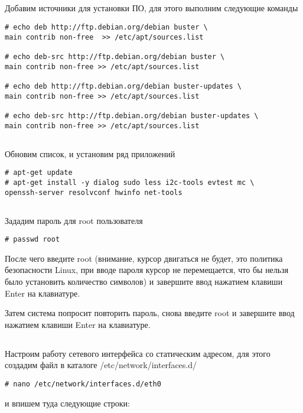 \subsection{}Добавим источники для установки ПО, для этого выполним следующие команды 
\begin{lstlisting}[style=bash]
# echo deb http://ftp.debian.org/debian buster \
main contrib non-free  >> /etc/apt/sources.list

# echo deb-src http://ftp.debian.org/debian buster \
main contrib non-free >> /etc/apt/sources.list

# echo deb http://ftp.debian.org/debian buster-updates \
main contrib non-free >> /etc/apt/sources.list

# echo deb-src http://ftp.debian.org/debian buster-updates \
main contrib non-free >> /etc/apt/sources.list
\end{lstlisting}

\subsection{} Обновим список, и установим ряд приложений
\begin{lstlisting}[style=bash]
# apt-get update
# apt-get install -y dialog sudo less i2c-tools evtest mc \
openssh-server resolvconf hwinfo net-tools
\end{lstlisting}

\subsection{}Зададим пароль для root пользователя
\begin{lstlisting}[style=bash]
# passwd root
\end{lstlisting}
После чего введите root (внимание, курсор двигаться не будет, это политика безопасности Linux, при вводе пароля курсор не перемещается, что бы нельзя было установить количество символов) и завершите ввод нажатием клавиши Enter на клавиатуре.

Затем система попросит повторить пароль, снова введите root и завершите ввод нажатием клавиши Enter на клавиатуре.

\subsection{}Настроим работу сетевого интерфейса со статическим адресом, для этого создадим файл в каталоге /etc/network/interfaces.d/

\begin{lstlisting}[style=bash]
# nano /etc/network/interfaces.d/eth0
\end{lstlisting}
и впишем туда следующие строки:

